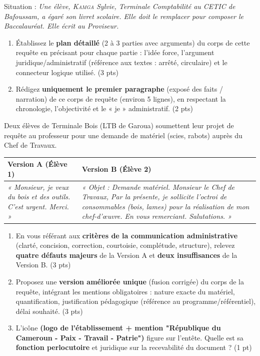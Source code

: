 \documentclass[11pt]{article}
\begin{document}
\begin{exercice}
Situation : \textit{Une élève, \textsc{Kamga} Sylvie, Terminale Comptabilité au CETIC de Bafoussam, a égaré son livret scolaire. Elle doit le remplacer pour composer le Baccalauréat. Elle écrit au Proviseur.}
\begin{enumerate}
    \item Établissez le \textbf{plan détaillé} (2 à 3 parties avec arguments) du corps de cette requête en précisant pour chaque partie : l'idée force, l'argument juridique/administratif (référence aux textes : arrêté, circulaire) et le connecteur logique utilisé. (3 pts)
    \item Rédigez \textbf{uniquement le premier paragraphe} (exposé des faits / narration) de ce corps de requête (environ 5 lignes), en respectant la chronologie, l'objectivité et le « je » administratif. (2 pts)
\end{enumerate}
\end{exercice}

\begin{exercice}
Deux élèves de Terminale Bois (LTB de Garoua) soumettent leur projet de requête au professeur pour une demande de matériel (scies, rabots) auprès du Chef de Travaux.
\begin{center}
    \begin{tabularx}{\linewidth}{@{}XX@{}}
        \toprule
        \textbf{Version A (Élève 1)} & \textbf{Version B (Élève 2)} \\
        \midrule
        \textit{« Monsieur, je veux du bois et des outils. C'est urgent. Merci. »} & \textit{« Objet : Demande matériel. Monsieur le Chef de Travaux, Par la présente, je sollicite l'octroi de consommables (bois, lames) pour la réalisation de mon chef-d'œuvre. En vous remerciant. Salutations. »} \\
        \bottomrule
    \end{tabularx}
\end{center}
\begin{enumerate}
    \item En vous référant aux \textbf{critères de la communication administrative} (clarté, concision, correction, courtoisie, complétude, structure), relevez \textbf{quatre défauts majeurs} de la Version A et \textbf{deux insuffisances} de la Version B. (3 pts)
    \item Proposez une \textbf{version améliorée unique} (fusion corrigée) du corps de la requête, intégrant les mentions obligatoires : nature exacte du matériel, quantification, justification pédagogique (référence au programme/référentiel), délai souhaité. (3 pts)
    \item L'icône \textbf{(logo de l'établissement + mention "République du Cameroun - Paix - Travail - Patrie")} figure sur l'entête. Quelle est sa \textbf{fonction perlocutoire} et juridique sur la recevabilité du document ? (1 pt)
\end{enumerate}
\end{exercice}
\end{document}
